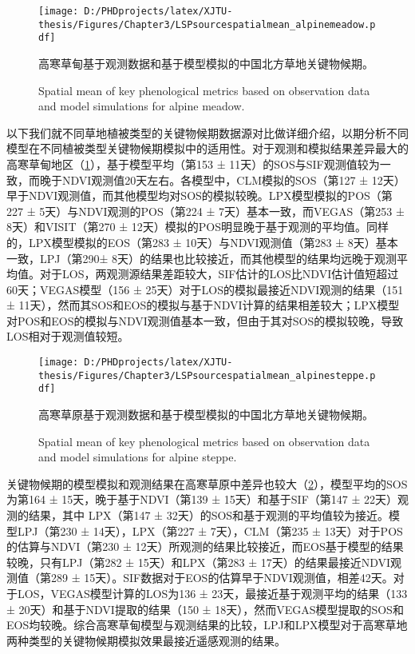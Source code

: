 \begin{figure}[h]
  \centering
  \texttt{[image: D:/PHDprojects/latex/XJTU-thesis/Figures/Chapter3/LSPsourcespatialmean\_alpinemeadow.pdf]}
  \caption{高寒草甸基于观测数据和基于模型模拟的中国北方草地关键物候期。}
  \addtocounter{figure}{-1}
  \vspace{5pt}
  \renewcommand{\figurename}{Fig}
  \caption{Spatial mean of key phenological metrics based on observation data and model simulations for alpine meadow.}
  \label{figure34}
\end{figure}

以下我们就不同草地植被类型的关键物候期数据源对比做详细介绍，以期分析不同模型在不同植被类型关键物候期模拟中的适用性。对于观测和模拟结果差异最大的高寒草甸地区（\cref{figure34}），基于模型平均（第153 ± 11天）的SOS与SIF观测值较为一致，而晚于NDVI观测值20天左右。各模型中，CLM模拟的SOS（第127 ± 12天）早于NDVI观测值，而其他模型均对SOS的模拟较晚。LPX模型模拟的POS（第227 ± 5天）与NDVI观测的POS（第224 ± 7天）基本一致，而VEGAS（第253 ± 8天）和VISIT（第270 ± 12天）模拟的POS明显晚于基于观测的平均值。同样的，LPX模型模拟的EOS（第283 ± 10天）与NDVI观测值（第283 ± 8天）基本一致，LPJ（第290± 8天）的结果也比较接近，而其他模型的结果均远晚于观测平均值。对于LOS，两观测源结果差距较大，SIF估计的LOS比NDVI估计值短超过60天；VEGAS模型（156 ± 25天）对于LOS的模拟最接近NDVI观测的结果（151 ± 11天），然而其SOS和EOS的模拟与基于NDVI计算的结果相差较大；LPX模型对POS和EOS的模拟与NDVI观测值基本一致，但由于其对SOS的模拟较晚，导致LOS相对于观测值较短。

\begin{figure}[h]
  \centering
  \texttt{[image: D:/PHDprojects/latex/XJTU-thesis/Figures/Chapter3/LSPsourcespatialmean\_alpinesteppe.pdf]}
  \caption{高寒草原基于观测数据和基于模型模拟的中国北方草地关键物候期。}
  \addtocounter{figure}{-1}
  \vspace{5pt}
  \renewcommand{\figurename}{Fig}
  \caption{Spatial mean of key phenological metrics based on observation data and model simulations for alpine steppe.}
  \label{figure35}
\end{figure}

关键物候期的模型模拟和观测结果在高寒草原中差异也较大（\cref{figure35}），模型平均的SOS为第164 ± 15天，晚于基于NDVI（第139 ± 15天）和基于SIF（第147 ± 22天）观测的结果，其中 LPX（第147 ± 32天）的SOS和基于观测的平均值较为接近。模型LPJ（第230 ± 14天），LPX（第227 ± 7天），CLM（第235 ± 13天）对于POS的估算与NDVI（第230 ± 12天）所观测的结果比较接近，而EOS基于模型的结果较晚，只有LPJ（第282 ± 15天）和LPX（第283 ± 17天）的结果最接近NDVI观测值（第289 ± 15天）。SIF数据对于EOS的估算早于NDVI观测值，相差42天。对于LOS，VEGAS模型计算的LOS为136 ± 23天，最接近基于观测平均的结果（133 ± 20天）和基于NDVI提取的结果（150 ± 18天），然而VEGAS模型提取的SOS和EOS均较晚。综合高寒草甸模型与观测结果的比较，LPJ和LPX模型对于高寒草地两种类型的关键物候期模拟效果最接近遥感观测的结果。

